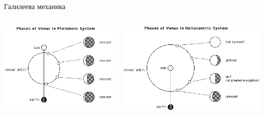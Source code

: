 \documentclass[10pt,a4paper]{beamer}
\begin{document}
        \begin{frame}{ Галилеева механика }
            \begin{columns}
                \begin{column}{0.3\textwidth}
                    \includegraphics[width=\textwidth]{images/galilei_venus_ptolomey.png}
                \end{column}
                \begin{column}{0.7\textwidth}
                    \includegraphics[width=\textwidth]{images/galilei_venus_copernic.png}
                \end{column}
            \end{columns}
        \end{frame}
        
\end{document}
